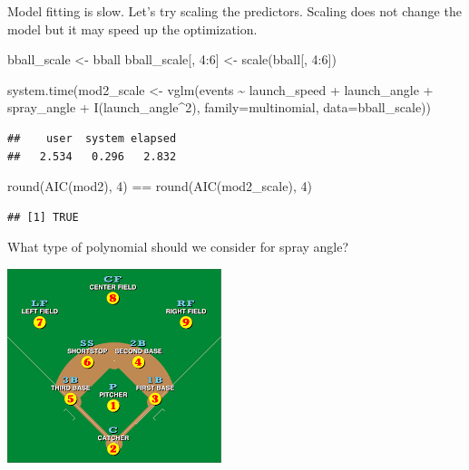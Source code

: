 \documentclass[
  ignorenonframetext,
]{beamer}
\newenvironment{Shaded}{\begin{snugshade}}{\end{snugshade}}
\newcommand{\AttributeTok}[1]{\textcolor[rgb]{0.77,0.63,0.00}{#1}}
\newcommand{\DecValTok}[1]{\textcolor[rgb]{0.00,0.00,0.81}{#1}}
\newcommand{\FunctionTok}[1]{\textcolor[rgb]{0.00,0.00,0.00}{#1}}
\newcommand{\NormalTok}[1]{#1}
\newcommand{\OtherTok}[1]{\textcolor[rgb]{0.56,0.35,0.01}{#1}}
\newcommand{\SpecialCharTok}[1]{\textcolor[rgb]{0.00,0.00,0.00}{#1}}
\begin{document}
\begin{frame}[fragile]{}
\protect\hypertarget{section-9}{}
Model fitting is slow. Let's try scaling the predictors. Scaling does
not change the model but it may speed up the optimization.

\vspace{12pt}
\tiny

\begin{Shaded}
\begin{Highlighting}[]
\NormalTok{bball\_scale }\OtherTok{\textless{}{-}}\NormalTok{ bball}
\NormalTok{bball\_scale[, }\DecValTok{4}\SpecialCharTok{:}\DecValTok{6}\NormalTok{] }\OtherTok{\textless{}{-}} \FunctionTok{scale}\NormalTok{(bball[, }\DecValTok{4}\SpecialCharTok{:}\DecValTok{6}\NormalTok{])}

\FunctionTok{system.time}\NormalTok{(mod2\_scale }\OtherTok{\textless{}{-}} \FunctionTok{vglm}\NormalTok{(events }\SpecialCharTok{\textasciitilde{}}\NormalTok{ launch\_speed }\SpecialCharTok{+}\NormalTok{ launch\_angle }\SpecialCharTok{+} 
\NormalTok{    spray\_angle }\SpecialCharTok{+}  \FunctionTok{I}\NormalTok{(launch\_angle}\SpecialCharTok{\^{}}\DecValTok{2}\NormalTok{), }
    \AttributeTok{family=}\NormalTok{multinomial, }\AttributeTok{data=}\NormalTok{bball\_scale))}
\end{Highlighting}
\end{Shaded}

\begin{verbatim}
##    user  system elapsed 
##   2.534   0.296   2.832
\end{verbatim}

\begin{Shaded}
\begin{Highlighting}[]
\FunctionTok{round}\NormalTok{(}\FunctionTok{AIC}\NormalTok{(mod2), }\DecValTok{4}\NormalTok{) }\SpecialCharTok{==} \FunctionTok{round}\NormalTok{(}\FunctionTok{AIC}\NormalTok{(mod2\_scale), }\DecValTok{4}\NormalTok{)}
\end{Highlighting}
\end{Shaded}

\begin{verbatim}
## [1] TRUE
\end{verbatim}
\end{frame}

\begin{frame}{}
\protect\hypertarget{section-10}{}
What type of polynomial should we consider for spray angle?
\end{frame}

\begin{frame}{}
\protect\hypertarget{section-11}{}
\includegraphics{positions.png}
\end{frame}
\end{document}
